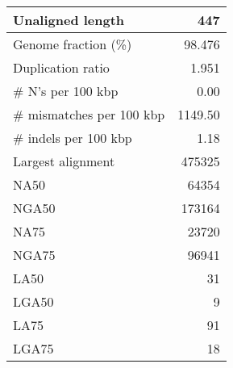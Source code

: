 \documentclass[12pt,a4paper]{article}
\begin{document}
\begin{table}[ht]
\begin{center}
\begin{tabular}{|l*{1}{|r}|}
Unaligned length & 447 \\ \hline
Genome fraction (\%) & 98.476 \\ \hline
Duplication ratio & 1.951 \\ \hline
\# N's per 100 kbp & 0.00 \\ \hline
\# mismatches per 100 kbp & 1149.50 \\ \hline
\# indels per 100 kbp & 1.18 \\ \hline
Largest alignment & 475325 \\ \hline
NA50 & 64354 \\ \hline
NGA50 & 173164 \\ \hline
NA75 & 23720 \\ \hline
NGA75 & 96941 \\ \hline
LA50 & 31 \\ \hline
LGA50 & 9 \\ \hline
LA75 & 91 \\ \hline
LGA75 & 18 \\ \hline
\end{tabular}
\end{center}
\end{table}
\end{document}
